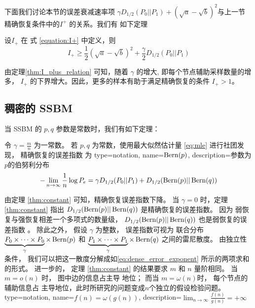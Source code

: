 下面我们讨论本节的误差衰减速率项
$\gamma D_{1/2}(P_0||P_1) +
(\sqrt{a} - \sqrt{b})^2$与上一节
精确恢复条件中的$I^+$ 的关系。我们有
如下定理
\begin{theorem}\label{thm:I_plus_relation}
    设$I_+$ 在 式 \eqref{equation:I+}
    中定义，则
    \begin{equation}
        I_+ \geq \frac{1}{2}
        (\sqrt{a} - \sqrt{b})^2 +
        \frac{\gamma}{2} D_{1/2}(P_0||P_1)
    \end{equation}
\end{theorem}
	由定理\ref{thm:I_plus_relation}
    可知，随着  $\gamma$ 的增大, 即每个节点辅助采样数量的增多， $I_+$
    的下界增大。因此，更多的样本有助于满足精确恢复的条件 $I_+>1$。 

\subsection{稠密的 SSBM}
当 SSBM 的 $p,q$ 参数是常数时，我们有如下定理：
\begin{theorem}\label{thm:constant}
	令 $\gamma = \frac{m}{n}$ 为一常数。
    若 $p,q$ 为常数，使用最大似然估计量 \eqref{eq:mle}
    进行社团发现，
	精确恢复的误差指数
    为
{
  type=notation,
  name={$\operatorname{Bern}(p)$},
  description={参数为$p$的伯努利分布}
}
	\begin{equation}\label{eq:dense_error_exponent}
	-\lim_{n\to \infty} \frac{1}{n}\log P_e = 
     \gamma D_{1/2}(P_0 || P_1) + D_{1/2}(\operatorname{Bern}(p)||\operatorname{Bern}(q))
	\end{equation} 
\end{theorem}

由定理 \ref{thm:constant} 可知，精确恢复误差指数下降。
当 $\gamma=0$ 时，定理 \ref{thm:constant} 指出
$D_{1/2}(\operatorname{Bern}(p)||\operatorname{Bern}(q))$
是精确恢复的误差指数。
因为
弱恢复与强恢复相差一个多项式的数量级，
$D_{1/2}(\operatorname{Bern}(p)||\operatorname{Bern}(q))$ 也是弱恢复的误差指数
\cite{zhang2016}。
除此之外， 假设 $\gamma$ 为整数，
误差指数可视为 
联合分布
$\underbrace{P_0\times \dots \times P_0}_{\gamma} \times \Bern(p)$
和 $\underbrace{P_1\times \dots \times P_1}_{\gamma} \times \Bern(q)$
之间的雷尼散度。
由独立性条件，
我们可以把这一散度分解成如\eqref{eq:dense_error_exponent}
所示的两项求和的形式。
进一步的， 定理 \ref{thm:constant}
的结果要求
$m$ 和 $n$ 量阶相同。
当 $m=o(n)$ 时，
图中边的信息占主导
地位；
而当 $m=\omega(n)$时，
每个节点的辅助信息占
主导地位，此时所研究的问题变成$n$个独立的假设检验问题。
{
  type=notation,
  name={$f(n)=\omega(g(n))$},
  description={$\lim_{n\to \infty} \frac{f(n)}{g(n)} = +\infty$}
}

